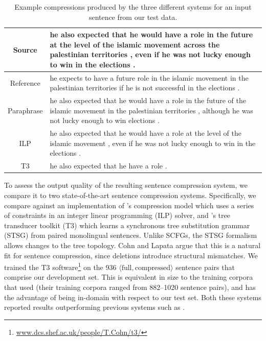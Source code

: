 \documentclass[11pt]{article}
\begin{document}
\begin{table}
\begin{center}
\small
\begin{tabular}{|c|p{13.2cm}|}
  \hline
  Source & he also expected that he would have a role in the future at
  the level of the islamic movement across the palestinian territories
  , even if he was not lucky enough to win in the elections . \\
  \hline
  Reference & he expects to have a future role in the islamic movement
  in the palestinian territories if he is not successful in the
  elections . \\
  \hline
  Paraphrase & he also expected that he would have a role in the future
  of the islamic movement in the palestinian territories , although he
  was not lucky enough to win elections . \\
  \hline
  ILP & he also expected that he would have a role at the level of the
  islamic movement , even if he was not lucky enough to win in the
  elections . \\
  \hline
  T3 & he also expected that he have a role . \\
  \hline
\end{tabular}
\normalsize
\end{center}
\caption{Example compressions produced by the three different systems
  for an input sentence from our test data.}
\label{test_examples}
\end{table}

To assess the output quality of the resulting sentence compression
system, we compare it to two state-of-the-art sentence compression
systems.  Specifically, we compare against an implementation of
's compression model which uses a series of
constraints in an integer linear programming (ILP) solver, and
's tree transducer toolkit (T3) which learns a
synchronous tree substitution grammar (STSG) from paired monolingual
sentences.  Unlike SCFGs, the STSG formalism allows changes to the
tree topology. Cohn and Lapata argue that this is a natural fit for
sentence compression, since deletions introduce structural mismatches.
We trained the T3
software\footnote{\url{www.dcs.shef.ac.uk/people/T.Cohn/t3/}} on the
936 $\langle\text{full}, \text{compressed}\rangle$ sentence pairs that
comprise our development set.  This is equivalent in size to the
training corpora that  used (their training corpora
ranged from 882--1020 sentence pairs), and has the advantage of being
in-domain with respect to our test set.  Both these systems reported
results outperforming previous systems such as .
\end{document}
